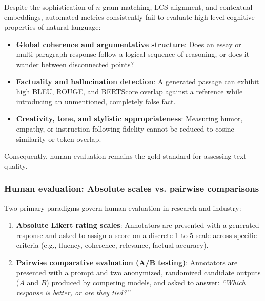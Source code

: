 \documentclass[../../main.tex]{subfiles}
\begin{document}
Despite the sophistication of $n$-gram matching, LCS alignment, and contextual embeddings, automated metrics consistently fail to evaluate high-level cognitive properties of natural language:
\begin{itemize}
    \item \textbf{Global coherence and argumentative structure}: Does an essay or multi-paragraph response follow a logical sequence of reasoning, or does it wander between disconnected points?
    \item \textbf{Factuality and hallucination detection}: A generated passage can exhibit high BLEU, ROUGE, and BERTScore overlap against a reference while introducing an unmentioned, completely false fact.
    \item \textbf{Creativity, tone, and stylistic appropriateness}: Measuring humor, empathy, or instruction-following fidelity cannot be reduced to cosine similarity or token overlap.
\end{itemize}

Consequently, human evaluation remains the gold standard for assessing text quality.

\subsubsection{Human evaluation: Absolute scales vs. pairwise comparisons}
Two primary paradigms govern human evaluation in research and industry:
\begin{enumerate}
    \item \textbf{Absolute Likert rating scales}: Annotators are presented with a generated response and asked to assign a score on a discrete 1-to-5 scale across specific criteria (e.g., fluency, coherence, relevance, factual accuracy).
    \item \textbf{Pairwise comparative evaluation (A/B testing)}: Annotators are presented with a prompt and two anonymized, randomized candidate outputs ($A$ and $B$) produced by competing models, and asked to answer: \textit{``Which response is better, or are they tied?''}
\end{enumerate}
\end{document}
